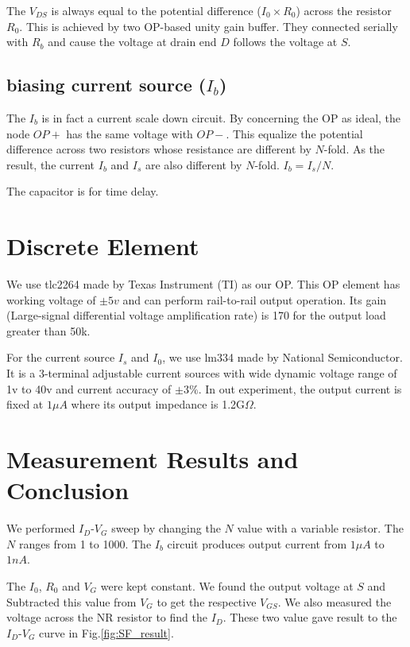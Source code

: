 The $V_{DS}$ is always equal to the potential difference ($I_0 \times R_0$) across the resistor $R_0$.
This is achieved by two OP-based unity gain buffer.
They connected serially with $R_b$ and cause the voltage at drain end $D$ follows the voltage at $S$.


\subsection*{biasing current source ($I_b$)}
The $I_b$ is in fact a current scale down circuit.
By concerning the OP as ideal, the node $OP+$ has the same voltage with $OP-$.
This equalize the potential difference across two resistors whose resistance are different by $N$-fold.
As the result, the current $I_b$ and $I_s$ are also different by $N$-fold.
$I_b = I_s / N$.

{\color{red}The capacitor is for time delay.}


\section{Discrete Element}
We use tlc2264 made by Texas Instrument (TI) as our OP.
This OP element has working voltage of $\pm 5v$ and can perform rail-to-rail output operation.
Its gain (Large-signal differential voltage amplification rate) is 170 for the output load greater than 50k.

For the current source $I_s$ and $I_0$, we use lm334 made by National Semiconductor.
It is a 3-terminal adjustable current sources with wide dynamic voltage range of 1v to 40v and current accuracy of $\pm 3\%$.
In out experiment, the output current is fixed at $1\mu A$ where its output impedance is 1.2G$\Omega$.

\section{Measurement Results and Conclusion}

We performed $I_D$-$V_G$ sweep by changing the $N$ value with a variable resistor.
The $N$ ranges from 1 to 1000.
The $I_b$ circuit produces output current from $1\mu A$ to $1n A$.

The $I_0$, $R_0$ and $V_G$ were kept constant.
We found the output voltage at $S$ and Subtracted this value from $V_G$ to get the respective $V_{GS}$.
We also measured the voltage across the N\*R resistor to find the $I_D$.
These two value gave result to the $I_D$-$V_G$ curve in Fig.\ref{fig:SF_result}.

